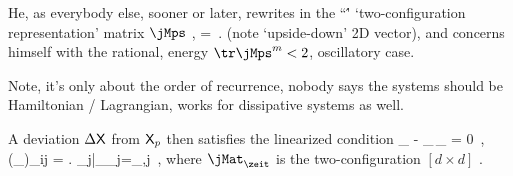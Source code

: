 He, as everybody else, sooner or later, rewrites  in
the ``\PV\'' `two-configuration representation'
matrix $\jMps$
,
\beq
 =
\,.
(note `upside-down' 2D vector), and concerns himself with
the rational,
energy $\tr \jMps^m<2$, oscillatory case.

Note, it's only about the order of recurrence, nobody says the systems
should be Hamiltonian / Lagrangian, works for dissipative systems as
well.





A deviation $\Delta\mathsf{X}$ from $\mathsf{X}_p$ then satisfies the linearized condition
\beq
\Delta\ssp_{\zeit} - \jMat_{}\,\Delta\ssp_{} = 0
\,,\qquad
(\jMat_{\zeit})_{ij}
=
\left.
           {\partial \ssp_{j}}\right|_{\ssp_{j}=\ssp_{\zeit,j}}
\,,
where $\jMat_{\zeit}$ is the two-configuration $[d\!\times\!{d}]$
\jacobianM.


